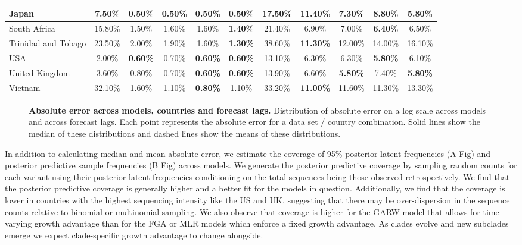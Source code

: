 \documentclass[10pt,letterpaper]{article}
\begin{document}
\begin{table}[!ht]
\begin{adjustwidth}{-2.25in}{0in}
\begin{tabular}{|l|c|c|c|c|c|c|c|c|c|c|}
        Japan & 7.50\% & \textbf{0.50\%} & \textbf{0.50\%} & \textbf{0.50\%} & \textbf{0.50\%} & 17.50\% & 11.40\% & 7.30\% & 8.80\% & \textbf{5.80\%} \\ \hline
        South Africa & 15.80\% & 1.50\% & 1.60\% & 1.60\% & \textbf{1.40\%} & 21.40\% & 6.90\% & 7.00\% & \textbf{6.40\%} & 6.50\% \\ \hline
        Trinidad and Tobago & 23.50\% & 2.00\% & 1.90\% & 1.60\% & \textbf{1.30\%} & 38.60\% & \textbf{11.30\%} & 12.00\% & 14.00\% & 16.10\% \\ \hline
        USA & 2.00\% &\textbf{0.60\%} & 0.70\% & \textbf{0.60\%} & \textbf{0.60\%} & 13.10\% & 6.30\% & 6.30\% & \textbf{5.80\%} & 6.10\% \\ \hline
        United Kingdom & 3.60\% & 0.80\% & 0.70\% & \textbf{0.60\%} & \textbf{0.60\%} & 13.90\% & 6.60\% & \textbf{5.80\%} & 7.40\% & \textbf{5.80\%} \\ \hline
        Vietnam & 32.10\% & 1.60\% & 1.10\% & \textbf{0.80\%} & 1.10\% & 33.20\% & \textbf{11.00\%} & 11.60\% & 11.30\% & 13.30\% \\ \hline
    \end{tabular}
	\end{adjustwidth}
\end{table}




\begin{figure}[tb!]
	\centering
	\caption{\textbf{Absolute error across models, countries and forecast lags.}
	Distribution of absolute error on a log scale across models and across forecast lags.
	Each point represents the absolute error for a data set / country combination.
	Solid lines show the median of these distributions and dashed lines show the means of these distributions.
	}
	\label{fig:Fig3}
\end{figure}

In addition to calculating median and mean absolute error, we estimate the coverage of 95\% posterior latent frequencies (A Fig) and posterior predictive sample frequencies (B Fig) across models.
We generate the posterior predictive coverage by sampling random counts for each variant using their posterior latent frequencies conditioning on the total sequences being those observed retrospectively.
We find that the posterior predictive coverage is generally higher and a better fit for the models in question.
Additionally, we find that the coverage is lower in countries with the highest sequencing intensity like the US and UK, suggesting that there may be over-dispersion in the sequence counts relative to binomial or multinomial sampling.
We also observe that coverage is higher for the GARW model that allows for time-varying growth advantage than for the FGA or MLR models which enforce a fixed growth advantage.
As clades evolve and new subclades emerge we expect clade-specific growth advantage to change alongside.
\end{document}
